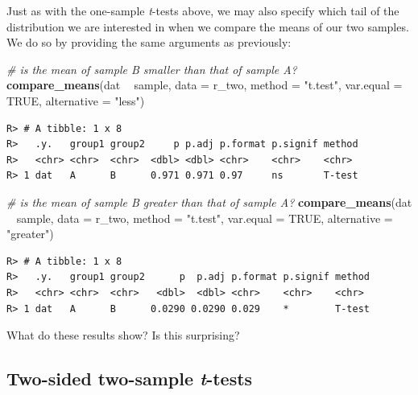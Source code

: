 \documentclass[english,10pt,a4paper,oneside]{book}
\newenvironment{Shaded}{\begin{snugshade}}{\end{snugshade}}
\newcommand{\CommentTok}[1]{\textcolor[rgb]{0.56,0.35,0.01}{\textit{#1}}}
\newcommand{\DataTypeTok}[1]{\textcolor[rgb]{0.13,0.29,0.53}{#1}}
\newcommand{\KeywordTok}[1]{\textcolor[rgb]{0.13,0.29,0.53}{\textbf{#1}}}
\newcommand{\NormalTok}[1]{#1}
\newcommand{\OperatorTok}[1]{\textcolor[rgb]{0.81,0.36,0.00}{\textbf{#1}}}
\newcommand{\OtherTok}[1]{\textcolor[rgb]{0.56,0.35,0.01}{#1}}
\newcommand{\StringTok}[1]{\textcolor[rgb]{0.31,0.60,0.02}{#1}}
\theoremstyle{definition}
\theoremstyle{definition}
\theoremstyle{definition}
\theoremstyle{remark}
\begin{document}
Just as with the one-sample \emph{t}-tests above, we may also specify
which tail of the distribution we are interested in when we compare the
means of our two samples. We do so by providing the same arguments as
previously:

\begin{Shaded}
\begin{Highlighting}[]
\CommentTok{# is the mean of sample B smaller than that of sample A?}
\KeywordTok{compare_means}\NormalTok{(dat }\OperatorTok{~}\StringTok{ }\NormalTok{sample, }\DataTypeTok{data =}\NormalTok{ r_two, }\DataTypeTok{method =} \StringTok{"t.test"}\NormalTok{, }\DataTypeTok{var.equal =} \OtherTok{TRUE}\NormalTok{, }\DataTypeTok{alternative =} \StringTok{"less"}\NormalTok{)}
\end{Highlighting}
\end{Shaded}

\begin{verbatim}
R> # A tibble: 1 x 8
R>   .y.   group1 group2     p p.adj p.format p.signif method
R>   <chr> <chr>  <chr>  <dbl> <dbl> <chr>    <chr>    <chr> 
R> 1 dat   A      B      0.971 0.971 0.97     ns       T-test
\end{verbatim}

\begin{Shaded}
\begin{Highlighting}[]
\CommentTok{# is the mean of sample B greater than that of sample A?}
\KeywordTok{compare_means}\NormalTok{(dat }\OperatorTok{~}\StringTok{ }\NormalTok{sample, }\DataTypeTok{data =}\NormalTok{ r_two, }\DataTypeTok{method =} \StringTok{"t.test"}\NormalTok{, }\DataTypeTok{var.equal =} \OtherTok{TRUE}\NormalTok{, }\DataTypeTok{alternative =} \StringTok{"greater"}\NormalTok{)}
\end{Highlighting}
\end{Shaded}

\begin{verbatim}
R> # A tibble: 1 x 8
R>   .y.   group1 group2      p  p.adj p.format p.signif method
R>   <chr> <chr>  <chr>   <dbl>  <dbl> <chr>    <chr>    <chr> 
R> 1 dat   A      B      0.0290 0.0290 0.029    *        T-test
\end{verbatim}

What do these results show? Is this surprising?

\hypertarget{two-sided-two-sample-t-tests}{%
\subsection{\texorpdfstring{Two-sided two-sample
\emph{t}-tests}{Two-sided two-sample t-tests}}\label{two-sided-two-sample-t-tests}}
\end{document}
